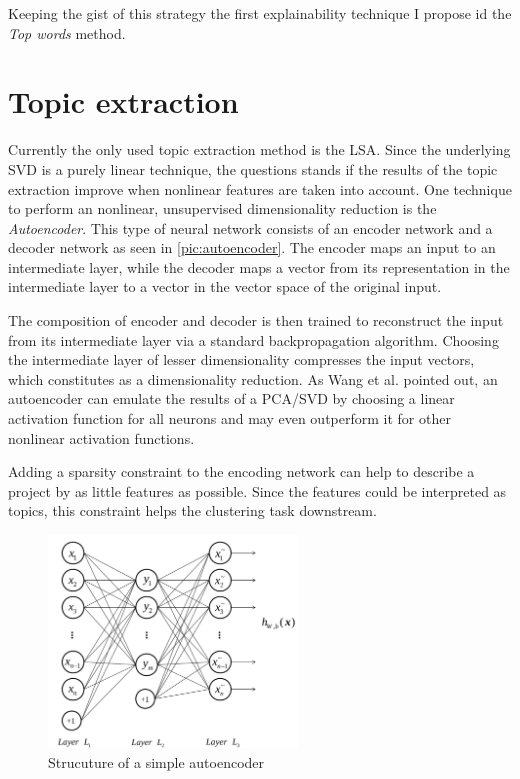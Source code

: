 Keeping the gist of this strategy the first explainability technique I propose id the \textit{Top words} method.

\section{Topic extraction}

Currently the only used topic extraction method is the LSA. Since the underlying SVD is a purely linear technique, the questions stands if the results of the topic extraction improve when nonlinear features are taken into account. One technique to perform an nonlinear, unsupervised dimensionality reduction is the \textit{Autoencoder}. This type of neural network consists of an encoder network and a decoder network as seen in \autoref{pic:autoencoder}. The encoder maps an input to an intermediate layer, while the decoder maps a vector from its representation in the intermediate layer to a vector in the vector space of the original input.

The composition of encoder and decoder is then trained to reconstruct the input from its intermediate layer via a standard backpropagation algorithm. Choosing the intermediate layer of lesser dimensionality compresses the input vectors, which constitutes as a dimensionality reduction. As Wang et al. \cite{wangAutoencoderBasedDimensionality2016} pointed out, an autoencoder can emulate the results of a PCA/SVD by choosing a linear activation function for all neurons and may even outperform it for other nonlinear activation functions.

Adding a sparsity constraint to the encoding network can help to describe a project by as little features as possible. Since the features could be interpreted as topics, this constraint helps the clustering task downstream.

\begin{figure}[t]
	\centering
	\includegraphics[width=250px]{../chapters/implementation/pics/autoencoder}
	\caption{\label{pic:autoencoder} Strucuture of a simple autoencoder {\cite{wangAutoencoderBasedDimensionality2016}}}
\end{figure} 


